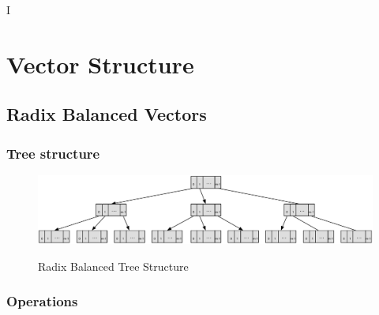 I%

\chapter{Vector Structure} %

\label{VectorStructure} %



\section{Radix Balanced Vectors}


\subsection{Tree structure}


\begin{figure}[h!]
  \centering
  \includegraphics[width=\textwidth]{Figures/Radix_Balanced}
  \label{badix_balanced}
  \caption{Radix Balanced Tree Structure}
\end{figure}



\subsection{Operations}


